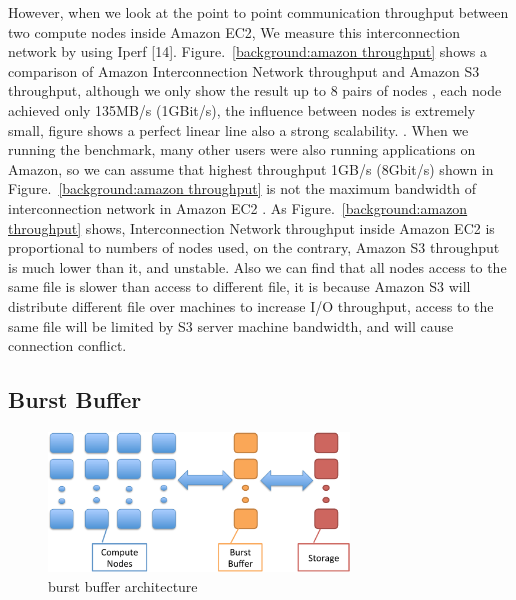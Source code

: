 However, when we look at the point to point communication throughput between two compute nodes
inside Amazon EC2,
We measure this interconnection network by using Iperf [14].
Figure.~\ref{background:amazon throughput} shows a comparison of Amazon Interconnection Network
throughput and Amazon S3 throughput, although we only show the result up to 8 pairs of nodes
, each node achieved only 135MB/s (1GBit/s), the
influence between nodes is extremely small, figure shows a perfect linear line also a strong scalability.
.
When we running the
benchmark, many other users were also running applications on Amazon, so we can assume that highest
throughput 1GB/s (8Gbit/s) shown in Figure.~\ref{background:amazon throughput} is not the
maximum bandwidth of interconnection network in Amazon EC2 .
As Figure.~\ref{background:amazon throughput} shows, Interconnection Network throughput inside
Amazon EC2 is proportional to numbers of nodes used, on the contrary, Amazon S3 throughput is much
lower than it, and unstable.
Also we can find that all nodes access to the same file is slower than access to different file,
it is because Amazon S3 will distribute different file over machines to increase I/O throughput,
access to the same file will be limited by S3 server machine bandwidth, and will cause connection
conflict.

\subsection{Burst Buffer}
\begin{figure}
\centering
\includegraphics[width=8cm]{img/burst_buffer.pdf}
\caption{burst buffer architecture}
\label{background:burst buffer architecture}
\end{figure}


